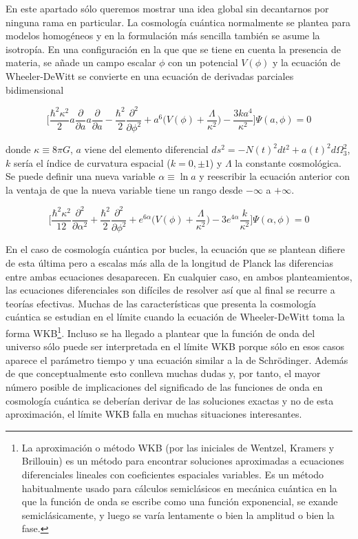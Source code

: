 \documentclass[11pt,a4paper,titlepage]{article}
\begin{document}
En este apartado sólo queremos mostrar una idea global sin decantarnos por ninguna rama en particular. La cosmología cuántica normalmente se plantea para modelos homogéneos y en la formulación más sencilla también se asume la isotropía. En una configuración en la que que se tiene en cuenta la presencia de materia, se añade un campo escalar $\phi$ con un potencial $V(\phi)$ y la ecuación de Wheeler-DeWitt se convierte en una ecuación de derivadas parciales bidimensional

\begin{equation*}
 \Bigg[\frac{\hbar^2\kappa^2}{2}a\frac{\partial}{\partial a}a\frac{\partial }{\partial a}-\frac{\hbar^2}{2}\frac{\partial^2}{\partial\phi^2}+a^6\Big(V(\phi)+\frac{\Lambda}{\kappa^2}\Big)-\frac{3ka^4}{\kappa^2}\Bigg]\Psi(a,\phi)=0
\end{equation*}

donde $\kappa\equiv8\pi G$, $a$ viene del elemento diferencial $ds^2=-N(t)^2dt^2+a(t)^2d\Omega_3^2$, $k$ sería el índice de curvatura espacial ($k=0,\pm1$) y $\Lambda$ la constante cosmológica. Se puede definir una nueva variable $\alpha\equiv\ln a$ y reescribir la ecuación anterior con la ventaja de que la nueva variable tiene un rango desde $-\infty$ a $+\infty$.

\begin{equation*}
 \Bigg[\frac{\hbar^2\kappa^2}{12}\frac{\partial^2}{\partial\alpha^2}+\frac{\hbar^2}{2}\frac{\partial^2}{\partial\phi^2}+e^{6\alpha}\Big(V(\phi)+\frac{\Lambda}{\kappa^2}\Big)-3e^{4\alpha}\frac{k}{\kappa^2}\Bigg]\Psi(\alpha,\phi)=0
\end{equation*}

En el caso de cosmología cuántica por bucles, la ecuación que se plantean difiere de esta última pero a escalas más alla de la longitud de Planck las diferencias entre ambas ecuaciones desaparecen. En cualquier caso, en ambos planteamientos, las ecuaciones diferenciales son difíciles de resolver así que al final se recurre a teorías efectivas. Muchas de las características que presenta la cosmología cuántica se estudian en el límite cuando la ecuación de Wheeler-DeWitt toma la forma WKB\footnote{La aproximación o método WKB (por las iniciales de Wentzel, Kramers y Brillouin) es un método para encontrar soluciones aproximadas a ecuaciones diferenciales lineales con coeficientes espaciales variables. Es un método habitualmente usado para cálculos semiclásicos en mecánica cuántica en la que la función de onda se escribe como una función exponencial, se exande semiclásicamente, y luego se varía lentamente o bien la amplitud o bien la fase.}. Incluso se ha llegado a plantear que la función de onda del universo sólo puede ser interpretada en el límite WKB porque sólo en esos casos aparece el parámetro tiempo y una ecuación similar a la de Schrödinger. Además de que conceptualmente esto conlleva muchas dudas y, por tanto, el mayor número posible de implicaciones del significado de las funciones de onda en cosmología cuántica se deberían derivar de las soluciones exactas y no de esta aproximación, el límite WKB falla en muchas situaciones interesantes.
\end{document}
